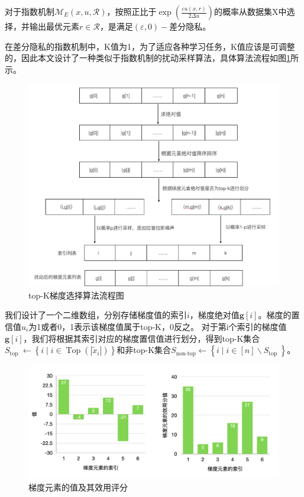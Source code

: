 对于指数机制$\mathcal{M}_{E}(x, u, \mathcal{R})$，按照正比于$\exp \left(\frac{\varepsilon u(x, r)}{2 \Delta u}\right)$的概率从数据集X中选择，并输出最优元素$r \in \mathcal{R}$，是满足$(\varepsilon, 0)-$差分隐私。

在差分隐私的指数机制中，K值为1，为了适应各种学习任务，K值应该是可调整的，因此本文设计了一种类似于指数机制的扰动采样算法，具体算法流程如图\ref{fig:top-K梯度选择算法流程图}所示。

\begin{figure}[!hbt]
\centering
	\includegraphics[scale=0.45]{fig2/C4/top-K流程图}%
	\caption{top-K梯度选择算法流程图}
	\label{fig:top-K梯度选择算法流程图}	
\end{figure}

我们设计了一个二维数组，分别存储梯度值的索引$i$，梯度绝对值$\mathbf{g}[i]$。梯度的置信值$u_{i}$为1或者0，1表示该梯度值属于top-K，0反之。
对于第i个索引的梯度值$\mathbf{g}[i]$，我们将根据其索引对应的梯度置信值进行划分，得到top-K集合$S_{\text {top }} \leftarrow\left\{i \mid i \in \operatorname{Top}\left(\left|\tilde{x}_{i}\right|\right)\right\}$和非top-K集合$S_{\text {non-top}} \leftarrow\left\{i \mid i \in[n] \backslash S_{\text {top }}\right\}$。

\begin{figure}[!hbt]
\centering
	\includegraphics[scale=0.45]{fig2/C4/梯度值打分}%
	\caption{梯度元素的值及其效用评分}
	\label{fig:梯度元素的值及其效用评分}	
\end{figure}

